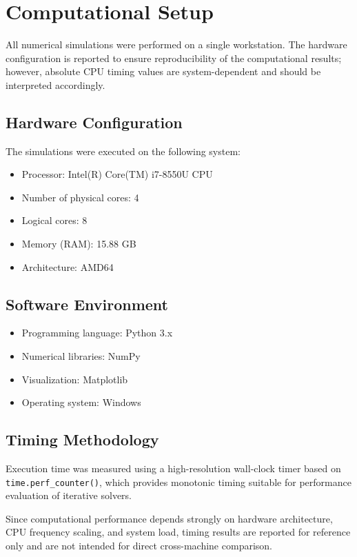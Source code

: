 \section{Computational Setup}

All numerical simulations were performed on a single workstation. The hardware configuration is reported to ensure reproducibility of the computational results; however, absolute CPU timing values are system-dependent and should be interpreted accordingly.

\subsection{Hardware Configuration}

The simulations were executed on the following system:

\begin{itemize}
    \item Processor: Intel(R) Core(TM) i7-8550U CPU
    \item Number of physical cores: 4
    \item Logical cores: 8
    \item Memory (RAM): 15.88 GB
    \item Architecture: AMD64
\end{itemize}

\subsection{Software Environment}

\begin{itemize}
    \item Programming language: Python 3.x
    \item Numerical libraries: NumPy
    \item Visualization: Matplotlib
    \item Operating system: Windows
\end{itemize}

\subsection{Timing Methodology}

Execution time was measured using a high-resolution wall-clock timer based on \texttt{time.perf\_counter()}, which provides monotonic timing suitable for performance evaluation of iterative solvers.

Since computational performance depends strongly on hardware architecture, CPU frequency scaling, and system load, timing results are reported for reference only and are not intended for direct cross-machine comparison.